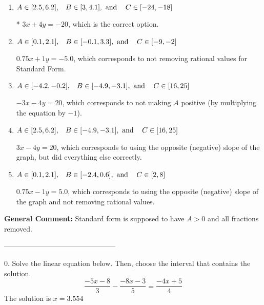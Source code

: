 \documentclass{extbook}[14pt]
\begin{document}
\begin{enumerate}[label=\Alph*.] 
\item $ A \in [2.5, 6.2], \hspace{3mm} B \in [3, 4.1], \text{ and } \hspace{3mm} C \in [-24, -18] $ 

 * $3x + 4y = -20$, which is the correct option. 
\item $ A \in [0.1, 2.1], \hspace{3mm} B \in [-0.1, 3.3], \text{ and } \hspace{3mm} C \in [-9, -2] $ 

  $0.75x + 1y = -5.0$, which corresponds to not removing rational values for Standard Form. 
\item $ A \in [-4.2, -0.2], \hspace{3mm} B \in [-4.9, -3.1], \text{ and } \hspace{3mm} C \in [16, 25] $ 

  $-3x - 4y = 20$, which corresponds to not making $A$ positive (by multiplying the equation by $-1$). 
\item $ A \in [2.5, 6.2], \hspace{3mm} B \in [-4.9, -3.1], \text{ and } \hspace{3mm} C \in [16, 25] $ 

  $3x - 4y = 20$, which corresponds to using the opposite (negative) slope of the graph, but did everything else correctly. 
\item $ A \in [0.1, 2.1], \hspace{3mm} B \in [-2.4, 0.6], \text{ and } \hspace{3mm} C \in [2, 8] $ 

  $0.75x - 1y = 5.0$, which corresponds to using the opposite (negative) slope of the graph and not removing rational values. 
\end{enumerate} 
 
\textbf{General Comment:} Standard form is supposed to have $A > 0$ and all fractions removed. 

-----------------------------------------------

0. Solve the linear equation below. Then, choose the interval that contains the solution.
\[ \frac{-5x -8}{3} - \frac{-8x -3}{5} = \frac{-4x + 5}{4} \] 
The solution is $ x = 3.554 $ 
\end{document}
